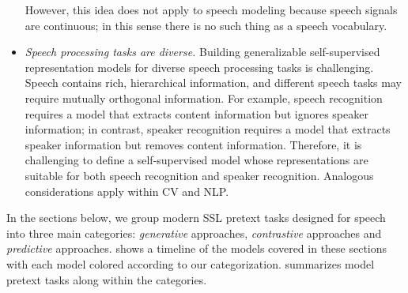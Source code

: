 \begin{itemize}
However, this idea does not apply to speech modeling because speech
signals are continuous; 
  in this sense there is no such thing as a speech vocabulary.   %
\item \textit{Speech processing tasks are diverse.}
Building generalizable self-supervised representation models for diverse speech
processing tasks is challenging.
Speech contains rich, hierarchical information, and different speech tasks
may require mutually orthogonal information.
For example, speech recognition requires a model that extracts content information
but ignores speaker information; in contrast, speaker recognition 
requires a model that extracts speaker information but removes content information.
Therefore, it is challenging to define a self-supervised model whose
representations are suitable for both speech recognition and speaker
recognition. Analogous considerations apply within CV and NLP.
\end{itemize}

In the sections below, we group modern SSL pretext tasks designed for speech
into three main categories: \textit{generative} approaches,
\textit{contrastive} approaches and \textit{predictive} approaches. 
 shows a timeline of the models covered in these sections
with each model colored according to our categorization. 
 summarizes model pretext tasks along within the categories.


%


